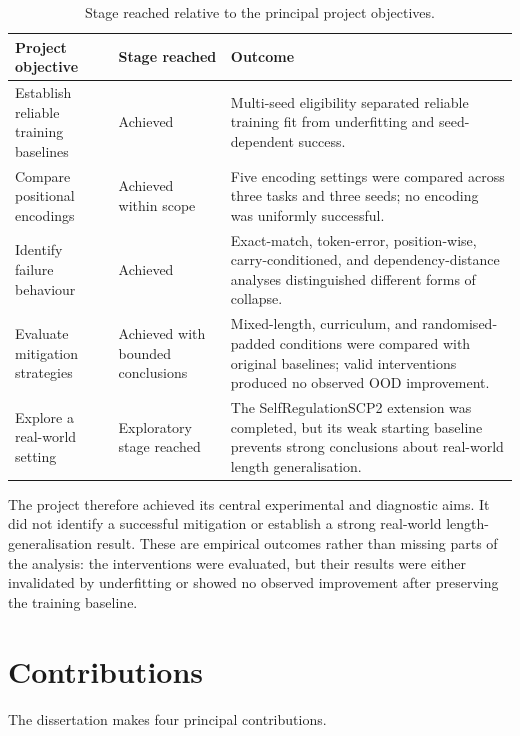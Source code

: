 \documentclass[
    author={Aanchala Ravindra Bhongade},
    supervisor={Dr. Fernando Moreno-Pino},
    degree={MSc},
    title={Length Generalisation in Transformer-Based Sequence Models: Failure Taxonomy and Mitigation Strategies},
    subtitle={},
    type={},
    year={2026}
]{dissertation}
\begin{document}
\begin{table}[htbp]
\centering
\small
\begin{tabular}{p{}p{}p{}}
\hline
Project objective & Stage reached & Outcome \\
\hline
Establish reliable training baselines
& Achieved
& Multi-seed eligibility separated reliable training fit from underfitting
and seed-dependent success. \\

Compare positional encodings
& Achieved within scope
& Five encoding settings were compared across three tasks and three seeds;
no encoding was uniformly successful. \\

Identify failure behaviour
& Achieved
& Exact-match, token-error, position-wise, carry-conditioned, and
dependency-distance analyses distinguished different forms of collapse. \\

Evaluate mitigation strategies
& Achieved with bounded conclusions
& Mixed-length, curriculum, and randomised-padded conditions were compared
with original baselines; valid interventions produced no observed OOD
improvement. \\

Explore a real-world setting
& Exploratory stage reached
& The SelfRegulationSCP2 extension was completed, but its weak starting
baseline prevents strong conclusions about real-world length generalisation. \\
\hline
\end{tabular}
\caption{Stage reached relative to the principal project objectives.}
\label{tab:project-aims}
\end{table}

The project therefore achieved its central experimental and diagnostic aims. It did not identify a successful mitigation or establish a strong real-world length-generalisation result. These are empirical outcomes rather than missing parts of the analysis: the interventions were evaluated, but their results were either invalidated by underfitting or showed no observed improvement after preserving the training baseline.

\section{Contributions}

The dissertation makes four principal contributions.
\end{document}
